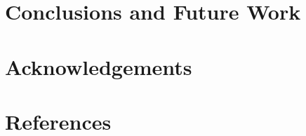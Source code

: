 \documentclass[review]{elsarticle}
\begin{document}
\begin{table}[!h]
	\centering
	\setlength{\tabcolsep}{7pt}
	\renewcommand{\arraystretch}{1.4}

	\caption{Experimental results obtained with X\% of labeled data}
	\label{undefined}
\end{table}

\section{Conclusions and Future Work}

\section{Acknowledgements}

\clearpage

\section*{References}


\end{document}
